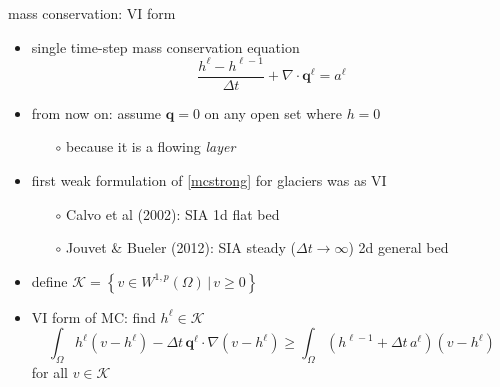 \documentclass[xcolor={dvipsnames}]{beamer}
\newcommand\bq{\mathbf{q}}
\newcommand\Div{\nabla\cdot}
\newcommand\grad{\nabla}
\begin{document}
\begin{frame}{mass conservation: VI form}

\begin{itemize}
\item single time-step mass conservation equation
\begin{equation}
\frac{h^\ell - h^{\ell-1}}{\Delta t} + \Div \bq^\ell = a^\ell \tag{MC} \label{mcstrong}
\end{equation}
\item from now on: assume $\bq=0$ on any open set where $h=0$
    \begin{itemize}
    \item[$\circ$] because it is a flowing \emph{layer}
    \end{itemize}
\item first weak formulation of \ref{mcstrong} for glaciers was as VI
    \begin{itemize}
    \item[$\circ$] Calvo et al (2002): SIA 1d flat bed
    \item[$\circ$] Jouvet \& Bueler (2012): SIA steady ($\Delta t\to \infty$) 2d general bed
    \end{itemize}
\item define $\mathcal{K} = \left\{v \in W^{1,p}(\Omega) \,\Big|\, v\ge 0\right\}$
\item VI form of MC: find $h^\ell\in\mathcal{K}$
    $$\int_\Omega h^\ell (v - h^\ell) - \Delta t\, \bq^\ell \cdot \grad(v - h^\ell) \ge \int_\Omega \left(h^{\ell-1} + \Delta t\, a^\ell\right) (v - h^\ell)$$
for all $v \in \mathcal{K}$
\end{itemize}
\end{frame}
\end{document}
